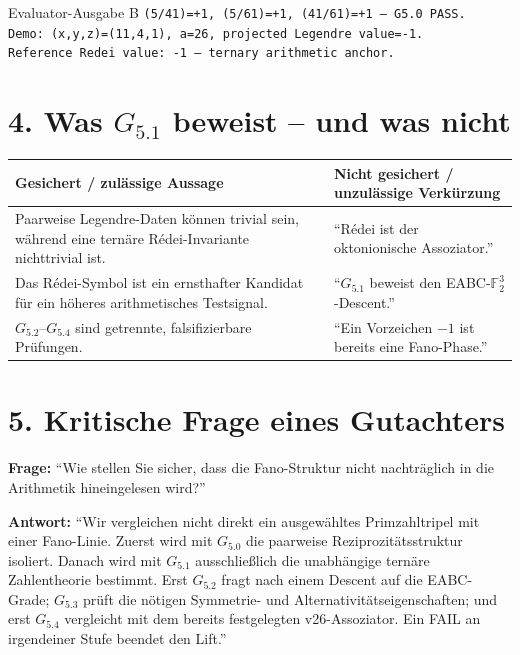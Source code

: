 \documentclass[11pt,a4paper]{article}
\begin{document}
\begin{statusbox}{Evaluator-Ausgabe B}
\texttt{(5/41)=+1, (5/61)=+1, (41/61)=+1 -- G5.0 PASS.}\\
\texttt{Demo: (x,y,z)=(11,4,1), a=26, projected Legendre value=-1.}\\
\texttt{Reference Redei value: -1 -- ternary arithmetic anchor.}
\end{statusbox}

\section*{4. Was $G_{5.1}$ beweist -- und was nicht}

\begin{center}
\renewcommand{\arraystretch}{1.25}
\begin{tabularx}{\textwidth}{X X}
\toprule
\textbf{Gesichert / zulässige Aussage} & \textbf{Nicht gesichert / unzulässige Verkürzung}\\
\midrule
Paarweise Legendre-Daten können trivial sein, während eine ternäre Rédei-Invariante nichttrivial ist. & ``Rédei ist der oktonionische Assoziator.''\\
Das Rédei-Symbol ist ein ernsthafter Kandidat für ein höheres arithmetisches Testsignal. & ``$G_{5.1}$ beweist den EABC-$\mathbb F_2^3$-Descent.''\\
$G_{5.2}$--$G_{5.4}$ sind getrennte, falsifizierbare Prüfungen. & ``Ein Vorzeichen $-1$ ist bereits eine Fano-Phase.''\\
\bottomrule
\end{tabularx}
\end{center}

\section*{5. Kritische Frage eines Gutachters}

\textbf{Frage:} ``Wie stellen Sie sicher, dass die Fano-Struktur nicht nachträglich in die Arithmetik hineingelesen wird?''

\textbf{Antwort:} ``Wir vergleichen nicht direkt ein ausgewähltes Primzahltripel mit einer Fano-Linie. Zuerst wird mit $G_{5.0}$ die paarweise Reziprozitätsstruktur isoliert. Danach wird mit $G_{5.1}$ ausschließlich die unabhängige ternäre Zahlentheorie bestimmt. Erst $G_{5.2}$ fragt nach einem Descent auf die EABC-Grade; $G_{5.3}$ prüft die nötigen Symmetrie- und Alternativitätseigenschaften; und erst $G_{5.4}$ vergleicht mit dem bereits festgelegten v26-Assoziator. Ein FAIL an irgendeiner Stufe beendet den Lift.''
\end{document}
